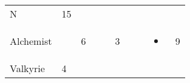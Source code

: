 \documentclass[12pt]{article}
\begin{document}
\begin{longtable}[]{@{}llllllllll@{}}
\begin{minipage}[t]{0.07\columnwidth}\raggedright\strut
N
\strut\end{minipage} &
\begin{minipage}[t]{0.08\columnwidth}\raggedright\strut
15
\strut\end{minipage}\tabularnewline
\begin{minipage}[t]{0.13\columnwidth}\raggedright\strut
Alchemist
\strut\end{minipage} &
\begin{minipage}[t]{0.06\columnwidth}\raggedright\strut
\strut\end{minipage} &
\begin{minipage}[t]{0.06\columnwidth}\raggedright\strut
6
\strut\end{minipage} &
\begin{minipage}[t]{0.06\columnwidth}\raggedright\strut
\strut\end{minipage} &
\begin{minipage}[t]{0.06\columnwidth}\raggedright\strut
\strut\end{minipage} &
\begin{minipage}[t]{0.06\columnwidth}\raggedright\strut
3
\strut\end{minipage} &
\begin{minipage}[t]{0.06\columnwidth}\raggedright\strut
\strut\end{minipage} &
\begin{minipage}[t]{0.06\columnwidth}\raggedright\strut
\strut\end{minipage} &
\begin{minipage}[t]{0.07\columnwidth}\raggedright\strut
\begin{itemize}
\item
\end{itemize}
\strut\end{minipage} &
\begin{minipage}[t]{0.08\columnwidth}\raggedright\strut
9
\strut\end{minipage}\tabularnewline
\begin{minipage}[t]{0.13\columnwidth}\raggedright\strut
Valkyrie
\strut\end{minipage} &
\begin{minipage}[t]{0.06\columnwidth}\raggedright\strut
4
\strut\end{minipage} &
\begin{minipage}[t]{0.06\columnwidth}\raggedright\strut
\strut\end{minipage} &
\begin{minipage}[t]{0.06\columnwidth}\raggedright\strut

\end{minipage}
\end{longtable}
\end{document}
